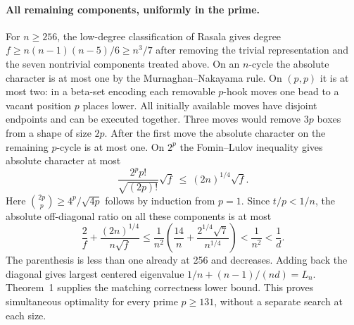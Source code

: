 \paragraph{All remaining components, uniformly in the prime.}
For $n\ge256$, the low-degree classification of Rasala
\citep{rasala} gives degree $f\ge n(n-1)(n-5)/6\ge n^3/7$
after removing the trivial representation and the seven nontrivial
components treated above. On an $n$-cycle the absolute character is
at most one by the Murnaghan--Nakayama rule. On $(p,p)$ it is at
most two: in a beta-set encoding each removable $p$-hook moves one
bead to a vacant position $p$ places lower. All initially available
moves have disjoint endpoints and can be executed together. Three
moves would remove $3p$ boxes from a shape of size $2p$. After
the first move the absolute character on the remaining $p$-cycle is
at most one. On $2^p$ the Fomin--Lulov inequality \citep{fominlulov}
gives absolute character at most
\[
 \frac{2^p p!}{\sqrt{(2p)!}}\sqrt f\ \le\ (2n)^{1/4}\sqrt f .
\]
Here $\binom{2p}{p}\ge4^p/\sqrt{4p}$ follows by induction from $p=1$.
Since $t/p<1/n$, the absolute off-diagonal ratio on all these components
is at most
\[
 \frac{2}{f}+\frac{(2n)^{1/4}}{n\sqrt f}
 \le \frac{1}{n^2}\left(\frac{14}{n}+
          \frac{2^{1/4}\sqrt7}{n^{1/4}}\right)<\frac1{n^2}<\frac1d.
\]
The parenthesis is less than one already at 256 and decreases.
Adding back the diagonal gives largest centered eigenvalue
$1/n+(n-1)/(nd)=L_n$. Theorem~1 supplies the matching correctness
lower bound. This proves simultaneous optimality for every prime
$p\ge131$, without a separate search at each size.
